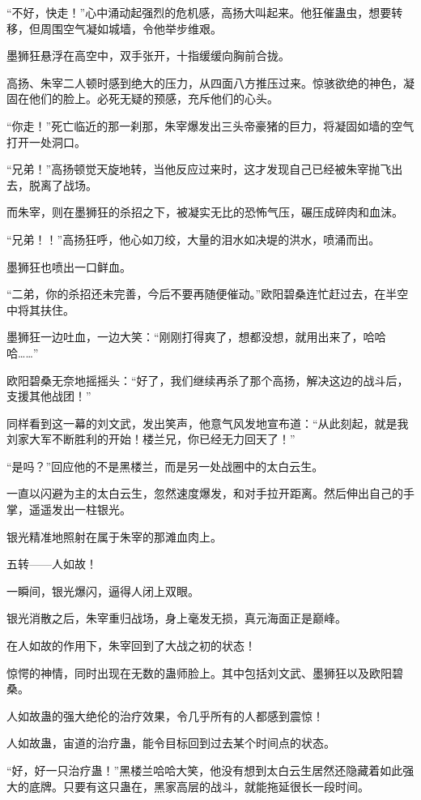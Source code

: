 \begin{this_body}
“不好，快走！”心中涌动起强烈的危机感，高扬大叫起来。他狂催蛊虫，想要转移，但周围空气凝如城墙，令他举步维艰。

墨狮狂悬浮在高空中，双手张开，十指缓缓向胸前合拢。

高扬、朱宰二人顿时感到绝大的压力，从四面八方推压过来。惊骇欲绝的神色，凝固在他们的脸上。必死无疑的预感，充斥他们的心头。

“你走！”死亡临近的那一刹那，朱宰爆发出三头帝豪猪的巨力，将凝固如墙的空气打开一处洞口。

“兄弟！”高扬顿觉天旋地转，当他反应过来时，这才发现自己已经被朱宰抛飞出去，脱离了战场。

而朱宰，则在墨狮狂的杀招之下，被凝实无比的恐怖气压，碾压成碎肉和血沫。

“兄弟！！”高扬狂呼，他心如刀绞，大量的泪水如决堤的洪水，喷涌而出。

墨狮狂也喷出一口鲜血。

“二弟，你的杀招还未完善，今后不要再随便催动。”欧阳碧桑连忙赶过去，在半空中将其扶住。

墨狮狂一边吐血，一边大笑：“刚刚打得爽了，想都没想，就用出来了，哈哈哈……”

欧阳碧桑无奈地摇摇头：“好了，我们继续再杀了那个高扬，解决这边的战斗后，支援其他战团！”

同样看到这一幕的刘文武，发出笑声，他意气风发地宣布道：“从此刻起，就是我刘家大军不断胜利的开始！楼兰兄，你已经无力回天了！”

“是吗？”回应他的不是黑楼兰，而是另一处战圈中的太白云生。

一直以闪避为主的太白云生，忽然速度爆发，和对手拉开距离。然后伸出自己的手掌，遥遥发出一柱银光。

银光精准地照射在属于朱宰的那滩血肉上。

五转——人如故！

一瞬间，银光爆闪，逼得人闭上双眼。

银光消散之后，朱宰重归战场，身上毫发无损，真元海面正是巅峰。

在人如故的作用下，朱宰回到了大战之初的状态！

惊愕的神情，同时出现在无数的蛊师脸上。其中包括刘文武、墨狮狂以及欧阳碧桑。

人如故蛊的强大绝伦的治疗效果，令几乎所有的人都感到震惊！

人如故蛊，宙道的治疗蛊，能令目标回到过去某个时间点的状态。

“好，好一只治疗蛊！”黑楼兰哈哈大笑，他没有想到太白云生居然还隐藏着如此强大的底牌。只要有这只蛊在，黑家高层的战斗，就能拖延很长一段时间。


\end{this_body}
